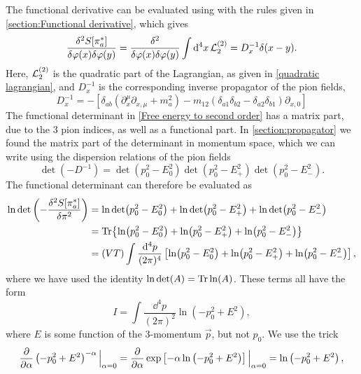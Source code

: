 The functional derivative can be evaluated using with the rules given in \autoref{section:Functional derivative}, which gives
\begin{align}
    \frac{\delta^2 S[\pi_a^*] }{\delta \varphi(x)\delta \varphi(y)}
    = \frac{\delta^2 }{\delta \varphi(x)\delta \varphi(y)} 
    \int \dd^4 x \, \mathcal{L}^{(2)}_2
    = D^{-1}_x \delta(x - y).
\end{align}
Here, $\mathcal{L}^{(2)}_2$ is the quadratic part of the Lagrangian, as given in \autoref{quadratic lagrangian}, and $D^{-1}_x$ is the corresponding inverse propagator of the pion fields,
\begin{equation}
    D_x^{-1} = 
    - \left[
        \delta_{ab}(\partial_x^\mu\partial_{x,\mu} + m^2_a)
        -  m_{12}(\delta_{a1} \delta_{b2} - \delta_{a2}\delta_{b1}) \partial_{x, 0}
    \right] 
\end{equation}
The functional determinant in \autoref{Free energy to second order} has a matrix part, due to the 3 pion indices, as well as a functional part.
In \autoref{section:propagator} we found the matrix part of  the determinant in momentum space, which we can write using the dispersion relations of the pion fields
\begin{equation}
    \det(- D^{-1}) = \det(p_0^2 - E_0^2) \det(p_0^2 - E_+^2) \det(p_0^2 - E_-^2).
\end{equation}
The functional determinant can therefore be evaluated as
\begin{align}
    \nonumber
    \ln{\det\left( - \frac{\delta^2 S[\pi_a^*]}{\delta \pi^2} \right)}
    & = \ln \det(p_0^2 - E_0^2) + \ln \det(p_0^2 - E_+^2) + \ln \det(p_0^2 - E_-^2) \\
    \nonumber
    & = \Tr{ \ln(p_0^2 - E_0^2) + \ln(p_0^2 - E_+^2)+  \ln(p_0^2 - E_-^2) } \\
    & = (VT) \int \frac{\dd^4 p}{(2 \pi)^4} 
    \left[ \ln(p_0^2 - E_0^2) + \ln(p_0^2 - E_+^2) + \ln(p_0^2 - E_-^2)  \right],
\end{align}
where we have used the identity $\ln\det(A) = \Tr \ln (A)$.
These terms all have the form
\begin{equation}
    I = \int \frac{\dd^4 p}{(2 \pi)^2} \ln(-p_0^2 + E^2),
\end{equation}
where $E$ is some function of the 3-momentum $\vec p$, but not $p_0$.
We use the trick
\begin{equation}
    \pdv{\alpha} \left(-p_0^2 + E^2\right)^{-\alpha} \Big|_{\alpha=0}
    = \pdv{\alpha} \exp\left[ -\alpha \ln\left(- p_0^2 + E^2\right)  \right] \Big|_{\alpha=0}
    = \ln\left(- p_0^2 + E^2\right),
\end{equation}
